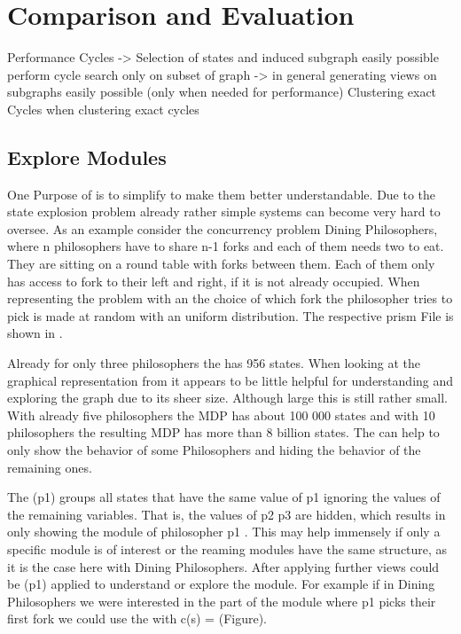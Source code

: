 \documentclass[preview]{standalone}
\begin{document}
\section{Comparison and Evaluation} \label{ch:eval}
Performance Cycles -> Selection of states and induced subgraph easily possible perform cycle search only on subset of graph 
-> in general generating views on subgraphs easily possible (only when needed for performance)
Clustering exact Cycles when clustering exact cycles


\subsection{Explore Modules} \label{subsec:evalmodules}

One Purpose of \viewsN is to simplify \mdpsN to make them better understandable. Due to the state explosion problem already rather simple systems can become very hard to oversee. As an example consider the concurrency problem Dining Philosophers, where n philosophers have to share n-1 forks and each of them needs two to eat. They are sitting on a round table with forks between them. Each of them only has access to fork to their left and right, if it is not already occupied. When representing the problem with an \mdpN the choice of which fork the philosopher tries to pick is made at random with an uniform distribution. The respective prism File is shown in .

Already for only three philosophers the \mdpN has 956 states. When looking at the graphical representation from \pmcvis {} it appears to be little helpful for understanding and exploring the graph due to its sheer size. Although large this \mdp is still rather small. With already five philosophers the MDP has about 100 000 states and with 10 philosophers the resulting MDP has more than 8 billion states. The \viewN \viewparamvalident can help to only show the behavior of some Philosophers and hiding the behavior of the remaining ones. 

The \viewN \viewparamvalident(p1) groups all states that have the same value of p1 ignoring the values of the remaining variables. That is, the values of p2 p3 are hidden, which results in only showing the module of philosopher p1 . This may help immensely if only a specific module is of interest or the reaming modules have the same structure, as it is the case here with Dining Philosophers. After applying further views could be \viewparamvalident(p1) applied to understand or explore the module. For example if in Dining Philosophers we were interested in the part of the module where p1 picks their first fork we could use the \viewN \viewparamdnf with c(s) = ({Figure}).
\end{document}
